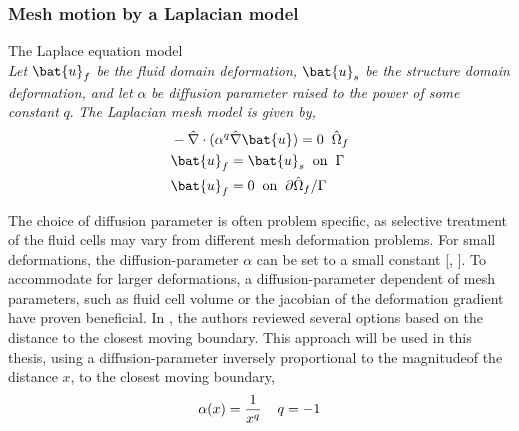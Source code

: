 \subsubsection*{Mesh motion by a Laplacian model}

\begin{equat}
The Laplace equation model \\ \textit{Let} $\bat{u}_f$ \textit{be the fluid domain deformation,} $\bat{u}_s$ \textit{be the structure domain deformation, and let} $\alpha$ \textit{be diffusion parameter raised to the power of some constant} $q$. \textit{The Laplacian  mesh model is given by, }   
\begin{align*}
&- \hat{\nabla} \cdot (\alpha^q \hat{\nabla} \bat{u}) = 0 \hspace{2mm} \hat{\Omega}_f\\
&\bat{u}_f = \bat{u}_s \hspace{2mm} \text{on} \hspace{2mm}  \Gamma \\
&\bat{u}_f = 0 \hspace{2mm} \text{on} \hspace{2mm} \partial \hat{\Omega}_f / \Gamma 
\end{align*}
\end{equat}

The choice of diffusion parameter  is often problem specific, as selective treatment of the fluid cells may vary from different mesh deformation problems. For small deformations, the diffusion-parameter $\alpha$ can be set to a small constant [\cite{Wick2013}, \cite{Richter2010c}]. To accommodate for larger deformations, a diffusion-parameter dependent of mesh parameters, such as fluid cell volume \cite{Crumpton1995} or the jacobian of the deformation gradient \cite{Stein} have proven beneficial. In \cite{Jasak2006}, the authors reviewed several options based on the distance to the closest moving boundary. This approach will be used in this thesis, using a diffusion-parameter inversely proportional to the magnitudeof the distance $x$, to the closest moving boundary,
\begin{align*}
\alpha(x) = \frac{1}{x^q}  \hspace{4mm} q = -1
\end{align*}


